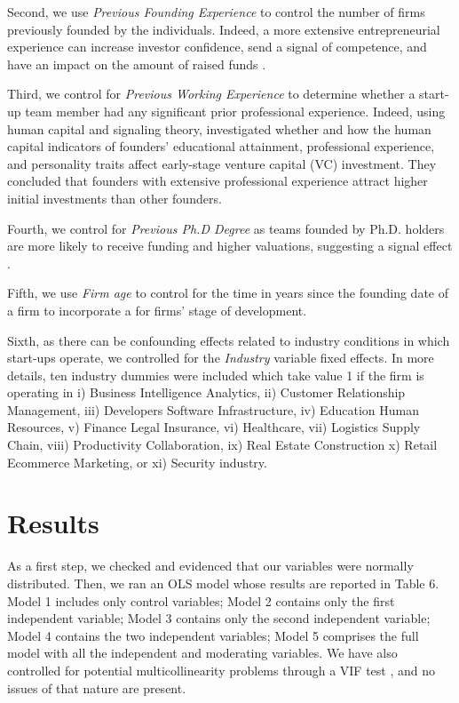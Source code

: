 \documentclass[12pt]{article}
\begin{document}
Second, we use \textit{Previous Founding Experience} to control the number of firms previously founded by the individuals. Indeed, a more extensive entrepreneurial experience can increase investor confidence, send a signal of competence, and have an impact on the amount of raised funds \citep{hsu2007experienced}.

Third, we control for \textit{Previous Working Experience} to determine whether a start-up team member had any significant prior professional experience. Indeed, using human capital and signaling theory, \citet{subramanian2022backing} investigated whether and how the human capital indicators of founders' educational attainment, professional experience, and personality traits affect early-stage venture capital (VC) investment. They concluded that founders with extensive professional experience attract higher initial investments than other founders.

Fourth, we control for \textit{Previous Ph.D Degree} as teams founded by Ph.D. holders are more likely to receive funding and higher valuations, suggesting a signal effect \citep{hsu2007experienced}.

Fifth, we use \textit{Firm age} to control for the time in years since the founding date of a firm to incorporate a for firms’ stage of development.

Sixth, as there can be confounding effects related to industry conditions in which start-ups operate, we controlled for the \textit{Industry} variable fixed effects. In more details, ten industry dummies were included which take value 1 if the firm is operating in i) Business Intelligence Analytics, ii) Customer Relationship Management, iii) Developers Software Infrastructure, iv) Education Human Resources, v) Finance Legal Insurance, vi) Healthcare, vii) Logistics Supply Chain, viii) Productivity Collaboration, ix) Real Estate Construction x) Retail Ecommerce Marketing, or xi) Security industry.

\section{Results}

As a first step, we checked and evidenced that our variables were normally distributed. Then, we ran an OLS model whose results are reported in Table 6\label{table6}. Model 1 includes only control variables; Model 2 contains only the first independent variable; Model 3 contains only the second independent variable; Model 4 contains the two independent variables; Model 5 comprises the full model with all the independent and moderating variables. We have also controlled for potential multicollinearity problems through a VIF test \citep{james2013introduction}, and no issues of that nature are present. \\
\end{document}
